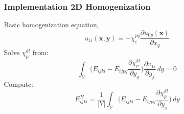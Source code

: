 \documentclass[10pt]{article}
\begin{document}
\subsubsection{Implementation 2D Homogenization}
Basic homogenization equation, 
\begin{equation}
u_{1i}(\textbf{x},\textbf{y}) = -\chi^{pq}_i\frac{\partial u_{0p}(\textbf{x})}{\partial x_q}
\end{equation}
Solve $\chi^{kl}_p$ from:
\begin{equation}
\int_Y \bigg ( E_{ijkl} - E_{ijpq}\frac{\partial\chi^{kl}_p}{\partial y_q}\bigg ) \frac{\partial v_{1i}}{\partial y_j}\,dy = 0
\end{equation}
Compute:
\begin{equation}\label{homoE}
E_{ijkl}^H=\frac{1}{|Y|}\int_Y\bigg (E_{ijkl} - E_{ijpq}\frac{\partial\chi^{kl}_p}{\partial y_q}\bigg )\,dy
\end{equation}
\end{document}
